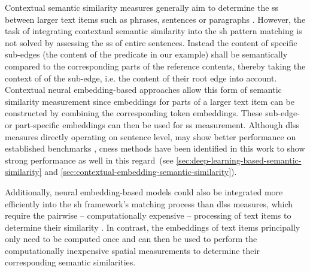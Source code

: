 \documentclass[11pt, numbers=noenddot]{scrreprt}
\let\cite\parencite  %
\begin{document}
Contextual semantic similarity measures generally aim to determine the \gls{ss} between larger text items such as phrases, sentences or paragraphs \cite{vermaSemanticSimilarityShort2020, zadSurveyDeepLearning2021}. However, the task of integrating contextual semantic similarity into the \gls{sh} pattern matching is not solved by assessing the \gls{ss} of entire sentences. Instead the content of specific sub-edges (the content of the predicate in our example) shall be semantically compared to the corresponding parts of the reference contents, thereby taking the context of of the sub-edge, i.e. the content of their root edge into account. Contextual neural embedding-based approaches allow this form of semantic similarity measurement since embeddings for parts of a larger text item can be constructed by combining the corresponding token embeddings. These sub-edge- or part-specific embeddings can then be used for \gls{ss} measurement. Although \gls{dlss} measures directly operating on sentence level, may show better performance on established benchmarks \cite{chandrasekaranEvolutionSemanticSimilarity2021}, \gls{cness} methods have been identified in this work to show strong performance as well in this regard (see \cref{sec:deep-learning-based-semantic-similarity} and \cref{sec:contextual-embedding-semantic-similarity}).

Additionally, neural embedding-based models could also be integrated more efficiently into the \gls{sh} framework's matching process than \gls{dlss} measures, which require the pairwise -- computationally expensive --  processing of text items to determine their similarity \cite{reimersSentenceBERTSentenceEmbeddings2019}. In contrast, the embeddings of text items principally only need to be computed once and can then be used to perform the computationally inexpensive spatial measurements to determine their corresponding semantic similarities.

%

\end{document}
